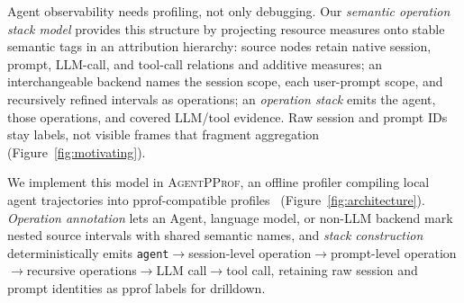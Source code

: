 \documentclass[letterpaper]{article}
\newcommand{\sys}{\textsc{AgentPProf}\xspace}
\begin{document}
Agent observability needs profiling, not only debugging.
Our \emph{semantic operation stack model} provides this structure by projecting
resource measures onto stable semantic tags in an attribution hierarchy: source
nodes retain native session, prompt, LLM-call, and tool-call relations and
additive measures; an interchangeable backend names the session scope, each
user-prompt scope, and recursively refined intervals as operations; an
\emph{operation stack} emits the agent, those operations, and covered LLM/tool
evidence. Raw session and prompt IDs stay labels, not visible frames that
fragment aggregation (Figure~\ref{fig:motivating}).

We implement this model in \sys, an offline profiler compiling local agent
trajectories into pprof-compatible profiles~\cite{pprof}
(Figure~\ref{fig:architecture}).
\emph{Operation annotation} lets an Agent, language model, or non-LLM backend
mark nested source intervals with shared semantic names, and \emph{stack
construction} deterministically emits
\texttt{agent}$\rightarrow$session-level operation$\rightarrow$prompt-level
operation$\rightarrow$recursive operations$\rightarrow$LLM call$\rightarrow$tool
call, retaining raw session and prompt identities as pprof labels for drilldown.
\end{document}
